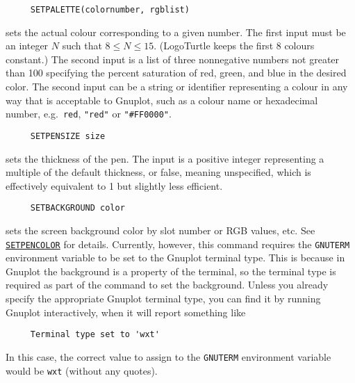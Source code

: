 \begin{verbatim}
     SETPALETTE(colornumber, rgblist)
\end{verbatim}
sets the actual colour corresponding to a given number.  The first
input must be an integer $N$ such that $8 \le N \le 15$. (LogoTurtle
keeps the first 8 colours constant.)  The second input is a list of
three nonnegative numbers not greater than 100 specifying the percent
saturation of red, green, and blue in the desired color.  The second
input can be a string or identifier representing a colour in any way
that is acceptable to Gnuplot, such as a colour name or hexadecimal
number, e.g.\ \texttt{red}, \texttt{"red"} or \texttt{"\#FF0000"}.

\begin{verbatim}
     SETPENSIZE size
\end{verbatim}
sets the thickness of the pen.  The input is a positive integer
representing a multiple of the default thickness, or false, meaning
unspecified, which is effectively equivalent to 1 but slightly less
efficient.




\begin{verbatim}
     SETBACKGROUND color
\end{verbatim}
sets the screen background color by slot number or RGB values, etc.
See \hyperref[logoturtle:setpencolor]{\texttt{SETPENCOLOR}} for
details.  Currently, however, this command requires the
\texttt{GNUTERM} environment variable to be set to the Gnuplot
terminal type.  This is because in Gnuplot the background is a
property of the terminal, so the terminal type is required as part of
the command to set the background.  Unless you already specify the
appropriate Gnuplot terminal type, you can find it by running Gnuplot
interactively, when it will report something like
\begin{verbatim}
     Terminal type set to 'wxt'
\end{verbatim}
In this case, the correct value to assign to the \texttt{GNUTERM}
environment variable would be \texttt{wxt} (without any quotes).


